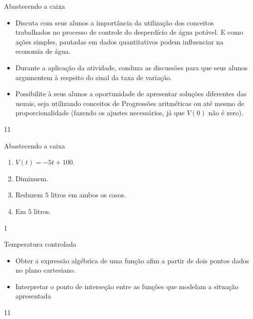 \begin{sugestions}{Abastecendo a caixa}
{
\begin{itemize}
\item Discuta com seus alunos a importância da utilização dos conceitos trabalhados no processo de controle do desperdício de água potável. E como ações simples, pautadas em dados quantitativos podem influenciar na economia de água.
\item Durante a aplicação da atividade, conduza as discussões para que seus alunos argumentem à respeito do sinal da taxa de variação.
\item Possibilite à seus alunos a oportunidade de apresentar soluções diferentes das usuais, seja utilizando conceitos de Progressões aritméticas ou até mesmo de proporcionalidade (fazendo os ajustes necessários, já que $V(0)$ não é zero).
\end{itemize}
}{1}{1}
\end{sugestions}
\begin{answer}{Abastecendo a caixa}
{
\begin{enumerate}
\item $V(t)=−5t+100$.
\item Diminuem.
\item Reduzem $5$ litros em ambos os casos.
\item Em $5$ litros.

\end{enumerate}
}{1}
\end{answer}
\begin{objectives}{Temperatura controlada}
{
\begin{itemize}
\item Obter a expressão algébrica de uma função afim a partir de dois pontos dados no plano cartesiano.
\item Interpretar o ponto de interseção entre as funções que modelam a situação apresentada
\end{itemize}
}{1}{1}
\end{objectives}
